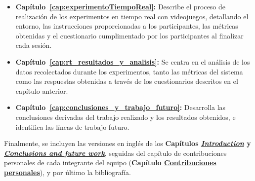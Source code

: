 \begin{itemize}
    \item \textbf{Capítulo~\ref{cap:experimentoTiempoReal}:} Describe el proceso de realización de los 
    experimentos en tiempo real con videojuegos, detallando el entorno, las 
    instrucciones proporcionadas a los participantes, las métricas obtenidas y 
    el cuestionario cumplimentado por los participantes al finalizar cada sesión.

    \item \textbf{Capítulo~\ref{cap:rt_resultados_y_analisis}:} Se centra en el análisis de los datos recolectados 
    durante los experimentos, tanto las métricas del sistema como las respuestas 
    obtenidas a través de los cuestionarios descritos en el capítulo anterior.

    \item \textbf{Capítulo~\ref{cap:conclusiones_y_trabajo_futuro}:} Desarrolla las conclusiones derivadas del trabajo 
    realizado y los resultados obtenidos, e identifica las líneas de trabajo 
    futuro.
\end{itemize}

Finalmente, se incluyen las versiones en inglés de los \textbf{Capítulos \hyperref[cap:introduction]{\textit{Introduction}} y \hyperref[cap:conclusionsAndFutureWork]{\textit{Conclusions and future work}}}, seguidas del capítulo de contribuciones personales de cada integrante del equipo (\textbf{Capítulo \hyperref[cap:contribucionesPersonales]{Contribuciones personales}}), y por último la bibliografía.